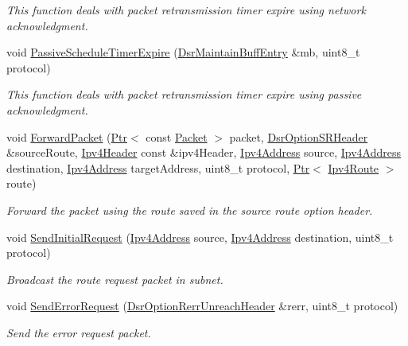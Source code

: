 \begin{DoxyCompactItemize}
\begin{DoxyCompactList}\small\item\em This function deals with packet retransmission timer expire using network acknowledgment. \end{DoxyCompactList}\item 
void \hyperlink{classns3_1_1dsr_1_1DsrRouting_a2f93ffc379338703d6b6a923dff44dd5}{Passive\+Schedule\+Timer\+Expire} (\hyperlink{classns3_1_1dsr_1_1DsrMaintainBuffEntry}{Dsr\+Maintain\+Buff\+Entry} \&mb, uint8\+\_\+t protocol)
\begin{DoxyCompactList}\small\item\em This function deals with packet retransmission timer expire using passive acknowledgment. \end{DoxyCompactList}\item 
void \hyperlink{classns3_1_1dsr_1_1DsrRouting_acae8a2eb510c8c9331104ab2aff29591}{Forward\+Packet} (\hyperlink{classns3_1_1Ptr}{Ptr}$<$ const \hyperlink{classns3_1_1Packet}{Packet} $>$ packet, \hyperlink{classns3_1_1dsr_1_1DsrOptionSRHeader}{Dsr\+Option\+S\+R\+Header} \&source\+Route, \hyperlink{classns3_1_1Ipv4Header}{Ipv4\+Header} const \&ipv4\+Header, \hyperlink{classns3_1_1Ipv4Address}{Ipv4\+Address} source, \hyperlink{classns3_1_1Ipv4Address}{Ipv4\+Address} destination, \hyperlink{classns3_1_1Ipv4Address}{Ipv4\+Address} target\+Address, uint8\+\_\+t protocol, \hyperlink{classns3_1_1Ptr}{Ptr}$<$ \hyperlink{classns3_1_1Ipv4Route}{Ipv4\+Route} $>$ route)
\begin{DoxyCompactList}\small\item\em Forward the packet using the route saved in the source route option header. \end{DoxyCompactList}\item 
void \hyperlink{classns3_1_1dsr_1_1DsrRouting_a74777d1806e768fccc1c2fe169b42c98}{Send\+Initial\+Request} (\hyperlink{classns3_1_1Ipv4Address}{Ipv4\+Address} source, \hyperlink{classns3_1_1Ipv4Address}{Ipv4\+Address} destination, uint8\+\_\+t protocol)
\begin{DoxyCompactList}\small\item\em Broadcast the route request packet in subnet. \end{DoxyCompactList}\item 
void \hyperlink{classns3_1_1dsr_1_1DsrRouting_ae2100978eb9447540ceceeda17e95cea}{Send\+Error\+Request} (\hyperlink{classns3_1_1dsr_1_1DsrOptionRerrUnreachHeader}{Dsr\+Option\+Rerr\+Unreach\+Header} \&rerr, uint8\+\_\+t protocol)
\begin{DoxyCompactList}\small\item\em Send the error request packet. \end{DoxyCompactList}\item 

\end{DoxyCompactItemize}
